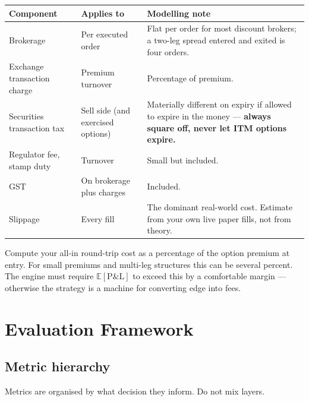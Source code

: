 \begin{longtable}{@{}p{4.6cm}p{4.2cm}p{5.6cm}@{}}
\toprule
\textbf{Component} & \textbf{Applies to} & \textbf{Modelling note}\\
\midrule
Brokerage & Per executed order & Flat per order for most discount brokers; a
two-leg spread entered and exited is four orders.\\
Exchange transaction charge & Premium turnover & Percentage of premium.\\
Securities transaction tax & Sell side (and exercised options) & Materially
different on expiry if allowed to expire in the money --- \textbf{always square
off, never let ITM options expire.}\\
Regulator fee, stamp duty & Turnover & Small but included.\\
GST & On brokerage plus charges & Included.\\
Slippage & Every fill & The dominant real-world cost. Estimate from your own
live paper fills, not from theory.\\
\bottomrule
\end{longtable}

\begin{keybox}[title={The breakeven reality check}]
Compute your all-in round-trip cost as a percentage of the option premium at
entry. For small premiums and multi-leg structures this can be several percent.
The engine must require $\mathbb{E}[\text{P\&L}]$ to exceed this by a
comfortable margin --- otherwise the strategy is a machine for converting edge
into fees.
\end{keybox}

\chapter{Evaluation Framework}
\label{ch:eval}

\section{Metric hierarchy}

Metrics are organised by what decision they inform. Do not mix layers.

